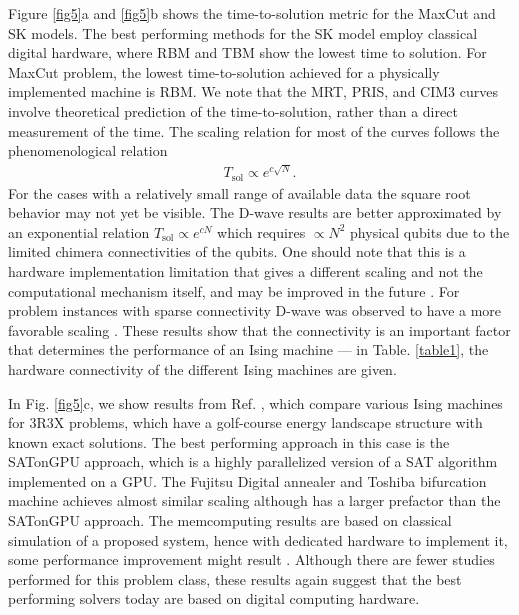 \documentclass[fleqn,10pt]{wlscirep}
\def\change#1{#1}
\begin{document}
Figure \ref{fig5}a and \ref{fig5}b shows the time-to-solution metric for the MaxCut and SK models.  The best performing methods for the SK model employ classical digital hardware, where RBM and TBM show the lowest time to solution. \change{For MaxCut problem, the lowest time-to-solution achieved for a physically implemented machine is RBM.  We note that the MRT, PRIS, and CIM3 curves involve theoretical prediction of the time-to-solution, rather than a direct measurement of the time. }  The scaling relation for most of the curves  follows the phenomenological relation
%
\begin{align}
    T_{\text{sol}}  \propto e^{c\sqrt{N}} .
    \label{squareroottts}
\end{align}
%
\change{For the cases with a relatively small range of available data the square root behavior may not yet be visible.}
\change{The D-wave results are better approximated by an exponential relation $ T_{\text{sol}}  \propto e^{cN} $ which requires $ \propto N^2$ physical qubits due to the limited chimera connectivities of the qubits.} One should note that this is a hardware implementation limitation that gives a different scaling and not the computational mechanism itself, and may be improved in the  future  \cite{mukai2019superconducting,onodera2020quantum,lechner2015quantum,puri2017quantum}. For problem instances with sparse connectivity D-wave was observed to have a more favorable scaling \cite{hamerly2019experimental}.  These results show that the connectivity is an important factor that determines the performance of an Ising machine --- in Table. \ref{table1}, the hardware connectivity of the different Ising machines are given.

\change{In Fig. \ref{fig5}c, we show results from Ref. \cite{kowalsky20213}, which compare various Ising machines for 3R3X problems, which have a golf-course energy landscape structure with known exact solutions. The best performing approach in this case is the SATonGPU approach, which is a highly parallelized version of a SAT algorithm implemented on a GPU.  The Fujitsu Digital annealer and Toshiba bifurcation machine achieves almost similar scaling although has a larger prefactor than the SATonGPU approach.  The memcomputing results are based on classical simulation of a proposed system, hence with dedicated hardware to implement it, some performance improvement might result \cite{kowalsky20213}. Although there are fewer studies performed for this problem class, these results again suggest that the best performing solvers today are based on digital computing hardware. }
\end{document}
